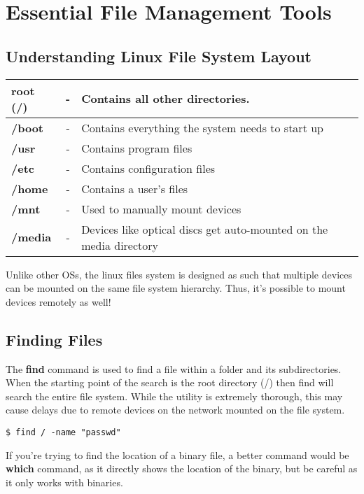 \chapter{Essential File Management Tools}
\section{Understanding Linux File System Layout}
\begin{tabular}{lcl}
	\toprule
	\textbf{root (/)} &- &Contains all other directories. \\
	\midrule
	\hspace{10pt}
	\textbf{/boot} &- &Contains everything the system needs to start up\\
	\hspace{10pt}
	\textbf{/usr} &- &Contains program files\\
	\hspace{10pt}
	\textbf{/etc} &- &Contains configuration files\\
	\hspace{10pt}
	\textbf{/home} &- &Contains a user's files\\
	\hspace{10pt}
	\textbf{/mnt} &- &Used to manually mount devices \\
	\hspace{10pt}
	\textbf{/media} &- &Devices like optical discs get auto-mounted on the media directory \\
	\bottomrule
\end{tabular}

\noindent
Unlike other OSs, the linux files system is designed as such that multiple devices can be mounted on the same file system hierarchy. Thus, it's possible to mount devices remotely as well!

\section{Finding Files}
The \textbf{find} command is used to find a file within a folder and its subdirectories. When the starting point of the search is the root directory (/) then find will search the entire file system. While the utility is extremely thorough, this may cause delays due to remote devices on the network mounted on the file system. 

\begin{verbatim}
$ find / -name "passwd"
\end{verbatim}

\noindent
If you're trying to find the location of a binary file, a better command would be \textbf{which} command, as it directly shows the location of the binary, but be careful as it only works with binaries.

